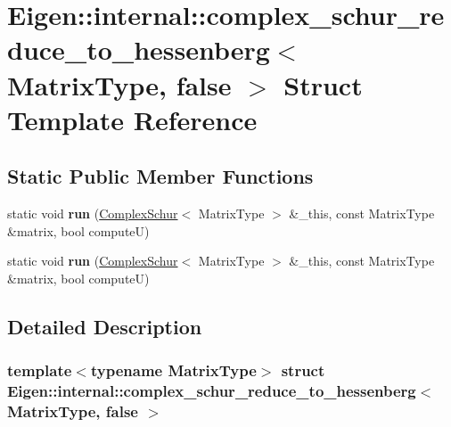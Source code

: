 \hypertarget{struct_eigen_1_1internal_1_1complex__schur__reduce__to__hessenberg_3_01_matrix_type_00_01false_01_4}{}\section{Eigen\+:\+:internal\+:\+:complex\+\_\+schur\+\_\+reduce\+\_\+to\+\_\+hessenberg$<$ Matrix\+Type, false $>$ Struct Template Reference}
\label{struct_eigen_1_1internal_1_1complex__schur__reduce__to__hessenberg_3_01_matrix_type_00_01false_01_4}
\subsection*{Static Public Member Functions}
\begin{DoxyCompactItemize}
\item 
\mbox{\label{struct_eigen_1_1internal_1_1complex__schur__reduce__to__hessenberg_3_01_matrix_type_00_01false_01_4_ac5afd1090b4ab0488035a861fc5c71a1}} 
static void {\bfseries run} (\hyperlink{group___eigenvalues___module_class_eigen_1_1_complex_schur}{Complex\+Schur}$<$ Matrix\+Type $>$ \&\+\_\+this, const Matrix\+Type \&matrix, bool computeU)
\item 
\mbox{\label{struct_eigen_1_1internal_1_1complex__schur__reduce__to__hessenberg_3_01_matrix_type_00_01false_01_4_ac5afd1090b4ab0488035a861fc5c71a1}} 
static void {\bfseries run} (\hyperlink{group___eigenvalues___module_class_eigen_1_1_complex_schur}{Complex\+Schur}$<$ Matrix\+Type $>$ \&\+\_\+this, const Matrix\+Type \&matrix, bool computeU)
\end{DoxyCompactItemize}


\subsection{Detailed Description}
\subsubsection*{template$<$typename Matrix\+Type$>$\newline
struct Eigen\+::internal\+::complex\+\_\+schur\+\_\+reduce\+\_\+to\+\_\+hessenberg$<$ Matrix\+Type, false $>$}



